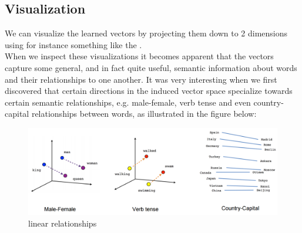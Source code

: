 \subsection{Visualization}

 We can visualize the learned vectors by projecting them down to 2 dimensions using for instance something like the \textcite{t-SNE dimensionality reduction technique}.\\ When we inspect these visualizations it becomes apparent that the vectors capture some general, and in fact quite useful, semantic information about words and their relationships to one another. It was very interesting when we first discovered that certain directions in the induced vector space specialize towards certain semantic relationships, e.g. male-female, verb tense and even country-capital relationships between words, as illustrated in the figure below:
 
  \begin{figure}[H]%
      \center%
        \includegraphics[width=1\textwidth]{images/linear-relationships.png}%
        \caption[linear]{linear relationships}\label{fig:nce-nplm}%
  \end{figure}
